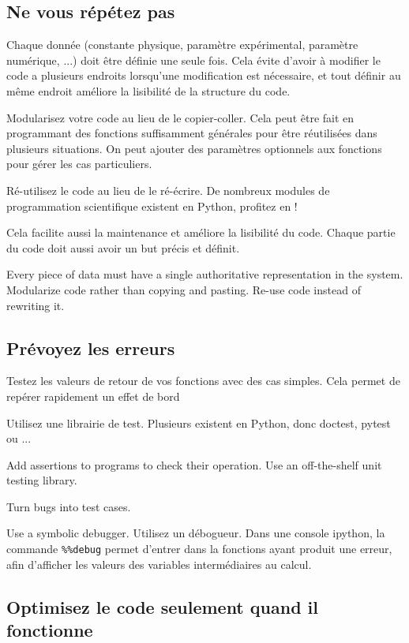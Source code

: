 \documentclass{article}
\begin{document}
\subsection{Ne vous répétez pas}

Chaque donnée (constante physique, paramètre expérimental, paramètre numérique, ...) doit être définie une seule fois. Cela évite d'avoir à modifier le code a plusieurs endroits lorsqu'une modification est nécessaire, et tout définir au même endroit améliore la lisibilité de la structure du code. 

Modularisez votre code au lieu de le copier-coller. Cela peut être fait en programmant des fonctions suffisamment générales pour être réutilisées dans plusieurs situations. On peut ajouter des paramètres optionnels aux fonctions pour gérer les cas particuliers.

Ré-utilisez le code au lieu de le ré-écrire. De nombreux modules de programmation scientifique existent en Python, profitez en !


Cela facilite aussi la maintenance et améliore la lisibilité du code. Chaque partie du code doit aussi avoir un but précis et définit.

    Every piece of data must have a single authoritative representation in the system.
    Modularize code rather than copying and pasting.
    Re-use code instead of rewriting it.


\subsection{Prévoyez les erreurs}

Testez les valeurs de retour de vos fonctions avec des cas simples. Cela permet de repérer rapidement un effet de bord 

Utilisez une librairie de test. Plusieurs existent en Python, donc doctest, pytest ou ...

    Add assertions to programs to check their operation.
    Use an off-the-shelf unit testing library.


    Turn bugs into test cases.


    Use a symbolic debugger.
Utilisez un débogueur. Dans une console ipython, la commande \texttt{\%\%debug} permet d'entrer dans la fonctions ayant produit une erreur, afin d'afficher les valeurs des variables intermédiaires au calcul.

\subsection{Optimisez le code seulement quand il fonctionne}
\end{document}
